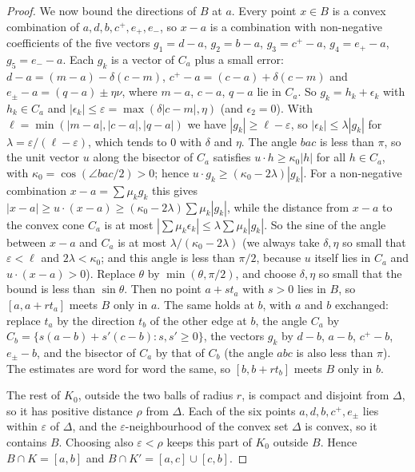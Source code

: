 \documentclass[11pt]{article}
\theoremstyle{plain}
\theoremstyle{definition}
\theoremstyle{remark}
\begin{document}
\begin{proof}
We now bound the directions of $B$ at $a$. Every point $x\in B$ is a convex combination of $a,d,b,c^+,e_+,e_-$,
so $x-a$ is a combination with non-negative coefficients of the five vectors $g_1=d-a$, $g_2=b-a$,
$g_3=c^+-a$, $g_4=e_+-a$, $g_5=e_--a$. Each $g_k$ is a vector of $C_a$ plus a small error: $d-a=(m-a)-\delta(c-m)$,
$c^+-a=(c-a)+\delta(c-m)$ and $e_\pm-a=(q-a)\pm\eta\nu$, where $m-a$, $c-a$, $q-a$ lie in $C_a$. So
$g_k=h_k+\epsilon_k$ with $h_k\in C_a$ and $|\epsilon_k|\le\varepsilon=\max(\delta|c-m|,\eta)$ (and $\epsilon_2=0$). With
$\ell=\min(|m-a|,|c-a|,|q-a|)$ we have $|g_k|\ge\ell-\varepsilon$, so $|\epsilon_k|\le\lambda|g_k|$ for
$\lambda=\varepsilon/(\ell-\varepsilon)$, which tends to $0$ with $\delta$ and $\eta$. The angle $bac$ is less than
$\pi$, so the unit vector $u$ along the bisector of $C_a$ satisfies $u\cdot h\ge\kappa_0|h|$ for all $h\in C_a$,
with $\kappa_0=\cos(\angle bac/2)>0$; hence $u\cdot g_k\ge(\kappa_0-2\lambda)|g_k|$. For a non-negative combination
$x-a=\sum\mu_kg_k$ this gives $|x-a|\ge u\cdot(x-a)\ge(\kappa_0-2\lambda)\sum\mu_k|g_k|$, while the distance from
$x-a$ to the convex cone $C_a$ is at most $|\sum\mu_k\epsilon_k|\le\lambda\sum\mu_k|g_k|$. So the sine of the angle
between $x-a$ and $C_a$ is at most $\lambda/(\kappa_0-2\lambda)$ (we always take $\delta,\eta$ so small that
$\varepsilon<\ell$ and $2\lambda<\kappa_0$; and this angle is less than $\pi/2$, because $u$ itself lies in $C_a$ and
$u\cdot(x-a)>0$). Replace $\theta$ by $\min(\theta,\pi/2)$, and choose $\delta,\eta$ so small that the bound is less
than $\sin\theta$. Then no point $a+st_a$ with $s>0$ lies in $B$, so $[a,a+rt_a]$ meets $B$ only in $a$. The
same holds at $b$, with $a$ and $b$ exchanged: replace $t_a$ by the direction $t_b$ of the other edge at
$b$, the angle $C_a$ by $C_b=\{s(a-b)+s'(c-b):s,s'\ge0\}$, the vectors $g_k$ by $d-b$, $a-b$, $c^+-b$,
$e_\pm-b$, and the bisector of $C_a$ by that of $C_b$ (the angle $abc$ is also less than $\pi$). The
estimates are word for word the same, so $[b,b+rt_b]$ meets $B$ only in $b$.

The rest of $K_0$, outside the two balls of radius $r$, is compact and disjoint from $\Delta$, so it has
positive distance $\rho$ from $\Delta$. Each of the six points $a,d,b,c^+,e_\pm$ lies within
$\varepsilon$ of $\Delta$, and the $\varepsilon$-neighbourhood of the convex set $\Delta$ is convex, so it
contains $B$. Choosing also $\varepsilon<\rho$ keeps this part of $K_0$ outside $B$. Hence $B\cap K=[a,b]$ and
$B\cap K'=[a,c]\cup[c,b]$.


\end{proof}
\end{document}
